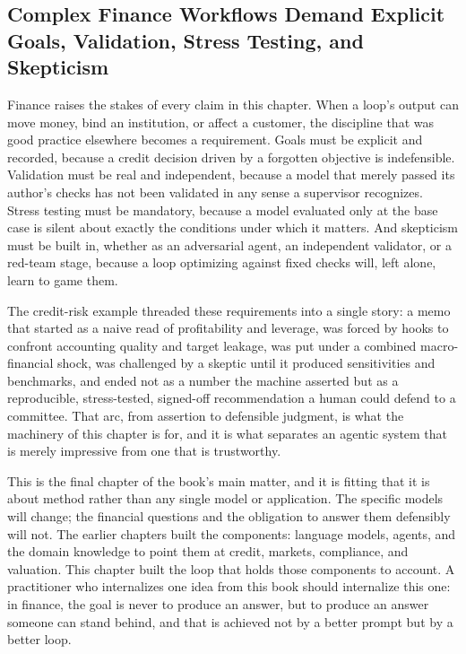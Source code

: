 \subsection{Complex Finance Workflows Demand Explicit Goals, Validation, Stress Testing, and Skepticism}\label{subsec:takeaway-finance}

Finance raises the stakes of every claim in this chapter. When a loop's output
can move money, bind an institution, or affect a customer, the discipline that
was good practice elsewhere becomes a requirement. Goals must be explicit and
recorded, because a credit decision driven by a forgotten objective is
indefensible. Validation must be real and independent, because a model that
merely passed its author's checks has not been validated in any sense a
supervisor recognizes. Stress testing must be mandatory, because a model
evaluated only at the base case is silent about exactly the conditions under
which it matters. And skepticism must be built in, whether as an adversarial agent, an
independent validator, or a red-team stage, because a loop optimizing against
fixed checks will, left alone, learn to game them.

The credit-risk example threaded these requirements into a single story: a memo
that started as a naive read of profitability and leverage, was forced by hooks
to confront accounting quality and target leakage, was put under a combined
macro-financial shock, was challenged by a skeptic until it produced
sensitivities and benchmarks, and ended not as a number the machine asserted but
as a reproducible, stress-tested, signed-off recommendation a human could defend
to a committee. That arc, from assertion to defensible judgment, is what
the machinery of this chapter is for, and it is what separates an agentic system
that is merely impressive from one that is trustworthy.

This is the final chapter of the book's main matter, and it is fitting that it is
about method rather than any single model or application. The specific
models will change; the financial questions and the obligation to answer them
defensibly will not. The earlier chapters built the components: language
models, agents, and the domain knowledge to point them at credit, markets,
compliance, and valuation. This chapter built the loop that holds those
components to account. A practitioner who internalizes one idea from this book
should internalize this one: in finance, the goal is never to produce an answer,
but to produce an answer someone can stand behind, and that is achieved not by
a better prompt but by a better loop.
